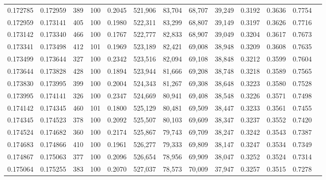 \begin{tabular}{rrrrrrrrrrrrr}
0.172785 & 0.172959 &   389 & 100 &                                     0.2045 & 521,906 &  83,704 &  68,707 &  39,249 & 0.3192 & 0.3636 & 0.7754 \\
0.172959 & 0.173141 &   405 & 100 &                                     0.1980 & 522,311 &  83,299 &  68,807 &  39,149 & 0.3197 & 0.3626 & 0.7716 \\
0.173142 & 0.173340 &   466 & 100 &                                     0.1767 & 522,777 &  82,833 &  68,907 &  39,049 & 0.3204 & 0.3617 & 0.7673 \\
0.173341 & 0.173498 &   412 & 101 &                                     0.1969 & 523,189 &  82,421 &  69,008 &  38,948 & 0.3209 & 0.3608 & 0.7635 \\
0.173499 & 0.173644 &   327 & 100 &                                     0.2342 & 523,516 &  82,094 &  69,108 &  38,848 & 0.3212 & 0.3599 & 0.7604 \\
0.173644 & 0.173828 &   428 & 100 &                                     0.1894 & 523,944 &  81,666 &  69,208 &  38,748 & 0.3218 & 0.3589 & 0.7565 \\
0.173830 & 0.173995 &   399 & 100 &                                     0.2004 & 524,343 &  81,267 &  69,308 &  38,648 & 0.3223 & 0.3580 & 0.7528 \\
0.173995 & 0.174141 &   326 & 100 &                                     0.2347 & 524,669 &  80,941 &  69,408 &  38,548 & 0.3226 & 0.3571 & 0.7498 \\
0.174142 & 0.174345 &   460 & 101 &                                     0.1800 & 525,129 &  80,481 &  69,509 &  38,447 & 0.3233 & 0.3561 & 0.7455 \\
0.174345 & 0.174523 &   378 & 100 &                                     0.2092 & 525,507 &  80,103 &  69,609 &  38,347 & 0.3237 & 0.3552 & 0.7420 \\
0.174524 & 0.174682 &   360 & 100 &                                     0.2174 & 525,867 &  79,743 &  69,709 &  38,247 & 0.3242 & 0.3543 & 0.7387 \\
0.174683 & 0.174866 &   410 & 100 &                                     0.1961 & 526,277 &  79,333 &  69,809 &  38,147 & 0.3247 & 0.3534 & 0.7349 \\
0.174867 & 0.175063 &   377 & 100 &                                     0.2096 & 526,654 &  78,956 &  69,909 &  38,047 & 0.3252 & 0.3524 & 0.7314 \\
0.175064 & 0.175255 &   383 & 100 &                                     0.2070 & 527,037 &  78,573 &  70,009 &  37,947 & 0.3257 & 0.3515 & 0.7278 \\

\end{tabular}
